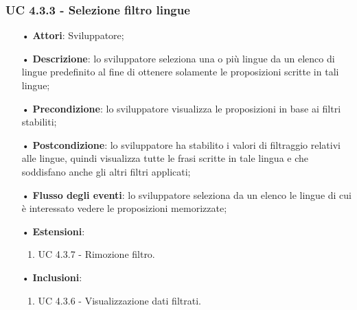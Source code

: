 \subsubsection{UC 4.3.3 -  Selezione filtro lingue}
\begin{itemize}
	\item[•]\textbf{Attori}: Sviluppatore;
	\item[•]\textbf{Descrizione}: lo sviluppatore seleziona una o più lingue da un elenco di lingue predefinito al fine di ottenere solamente le proposizioni scritte in tali lingue;
	\item[•]\textbf{Precondizione}: lo sviluppatore visualizza le proposizioni in base ai filtri stabiliti;
	\item[•]\textbf{Postcondizione}: lo sviluppatore ha stabilito i valori di filtraggio relativi alle lingue, quindi visualizza tutte le frasi scritte in tale lingua e che soddisfano anche gli altri filtri applicati;
	\item[•]\textbf{Flusso degli eventi}: lo sviluppatore seleziona da un elenco le lingue di cui è interessato vedere le proposizioni memorizzate;
	\item[•]\textbf{Estensioni}: 
	\begin{enumerate}
		\item UC 4.3.7 - Rimozione filtro.
	\end{enumerate}
	\item[•]\textbf{Inclusioni}:
	\begin{enumerate}
		\item UC 4.3.6 - Visualizzazione dati filtrati.
	\end{enumerate}
\end{itemize}

